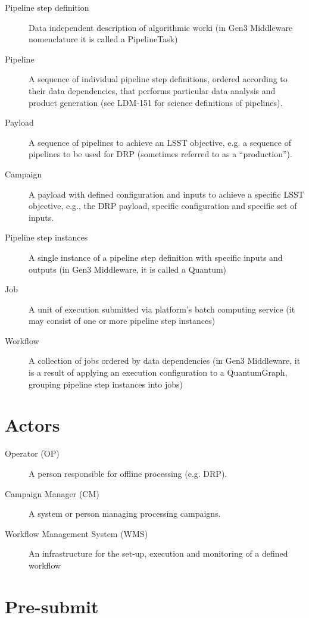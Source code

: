 \documentclass[DM,lsstdraft,toc]{lsstdoc}
\begin{document}
\begin{description}
  \item[Pipeline step definition]
    Data independent description of algorithmic worki (in Gen3 Middleware
    nomenclature it is called a PipelineTask)
  \item[Pipeline] 
    A sequence of individual pipeline step definitions, ordered according to
    their data dependencies, that performs particular data analysis and product
    generation (see LDM-151 for science definitions of pipelines).
  \item[Payload]
    A sequence of pipelines to achieve an LSST objective, e.g. a sequence of
    pipelines to be used for DRP (sometimes referred to as a ``production'').
  \item[Campaign]
    A payload with defined configuration and inputs to achieve a specific LSST
    objective, e.g., the DRP payload, specific configuration and specific set
    of inputs.
  \item[Pipeline step instances]
    A single instance of a pipeline step definition with specific inputs and
    outputs (in Gen3 Middleware, it is called a Quantum)
  \item[Job]
    A unit of execution submitted via platform's batch computing service (it
    may consist of one or more pipeline step instances)
  \item[Workflow]
    A collection of jobs ordered by data dependencies (in Gen3 Middleware, it
    is a result of applying an execution configuration to a QuantumGraph,
    grouping pipeline step instances into jobs)
\end{description}

\section{Actors}

\begin{description}
  \item[Operator (OP)]
    A person responsible for offline processing (e.g. DRP).
  \item[Campaign Manager (CM)]
    A system or person managing processing campaigns.
  \item[Workflow Management System (WMS)]
    An infrastructure for the set-up, execution and monitoring of a defined
    workflow
\end{description}


\section{Pre-submit}
\end{document}
